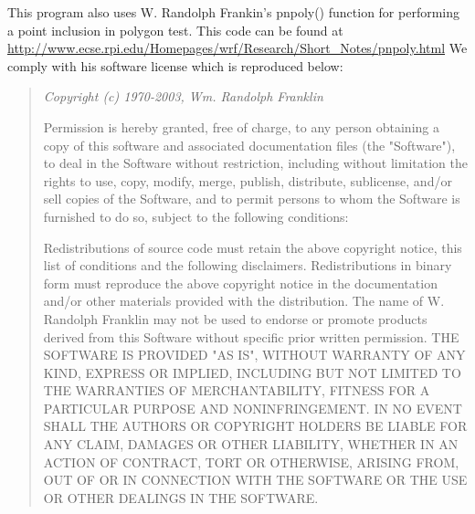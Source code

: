 This program also uses W. Randolph Frankin's pnpoly() 
function for performing a point inclusion in polygon test. 
This code can be found at
\url{http://www.ecse.rpi.edu/Homepages/wrf/Research/Short\_Notes/pnpoly.html}
We comply with his software license which is reproduced below\cite{Franklin05}:
\begin{quotation}\em
Copyright (c) 1970-2003, Wm. Randolph Franklin

Permission is hereby granted, free of charge, to any person obtaining a copy of this software and associated documentation files (the "Software"), to deal in the Software without restriction, including without limitation the rights to use, copy, modify, merge, publish, distribute, sublicense, and/or sell copies of the Software, and to permit persons to whom the Software is furnished to do so, subject to the following conditions:

Redistributions of source code must retain the above copyright notice, this list of conditions and the following disclaimers.
Redistributions in binary form must reproduce the above copyright notice in the documentation and/or other materials provided with the distribution.
The name of W. Randolph Franklin may not be used to endorse or promote products derived from this Software without specific prior written permission.
THE SOFTWARE IS PROVIDED "AS IS", WITHOUT WARRANTY OF ANY KIND, EXPRESS OR IMPLIED, INCLUDING BUT NOT LIMITED TO THE WARRANTIES OF MERCHANTABILITY, FITNESS FOR A PARTICULAR PURPOSE AND NONINFRINGEMENT. IN NO EVENT SHALL THE AUTHORS OR COPYRIGHT HOLDERS BE LIABLE FOR ANY CLAIM, DAMAGES OR OTHER LIABILITY, WHETHER IN AN ACTION OF CONTRACT, TORT OR OTHERWISE, ARISING FROM, OUT OF OR IN CONNECTION WITH THE SOFTWARE OR THE USE OR OTHER DEALINGS IN THE SOFTWARE.
\end{quotation}

